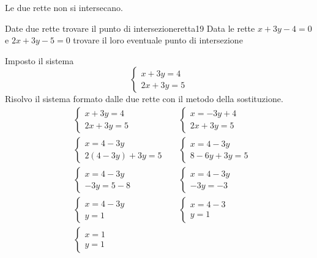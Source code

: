 Le due rette non si intersecano.
\begin{esempiot}{Date due rette trovare il punto di intersezione}{retta19}
	Data le rette $x+3y-4=0$ e $2x+3y-5=0$ trovare il loro eventuale punto di intersezione
\end{esempiot}
Imposto il sistema 
\[\begin{cases} 
x+3y=4\\
2x+3y=5
\end{cases}\]
Risolvo il sistema formato dalle due rette  con il metodo della sostituzione.
\begin{align*}
	&\begin{cases} 
	x+3y=4\\
	2x+3y=5
	\end{cases}&&\begin{cases} 
x=-3y+4\\
2x+3y=5
\end{cases}\\
&\begin{cases} 
	x=4-3y\\
	2(4-3y)+3y=5
\end{cases}&&\begin{cases} 
	x=4-3y\\
	8-6y+3y=5
\end{cases}\\
&\begin{cases} 
	x=4-3y\\
	-3y=5-8
\end{cases}&&\begin{cases} 
x=4-3y\\
-3y=-3
\end{cases}\\
&\begin{cases} 
	x=4-3y\\
	y=1
\end{cases}&&\begin{cases} 
x=4-3\\
y=1
\end{cases}\\
&\begin{cases} 
	x=1\\
	y=1
\end{cases}\\
\end{align*}